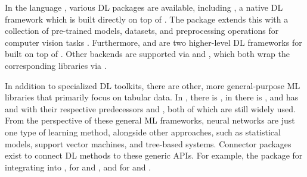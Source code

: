 \documentclass[article]{jss}
\theoremstyle{definition}
\begin{document}
In the  language \citep{ref-R-base}, various DL packages are available, including  \citep{ref-torch2025}, a native DL framework which is built directly on top of .
The  \rlang{} package extends this with a collection of pre-trained models, datasets, and preprocessing operations for computer vision tasks \citep{ref-r-torchvision}.
Furthermore,  \citep{ref-luz2023} and  \citep{ref-cito2024} are two higher-level DL frameworks for \rlang{} built on top of \torch{}.
Other backends are supported via  \citep{ref-keras32025} and  \citep{ref-r-tensorflow2024}, which both wrap the corresponding \python{} libraries via  \citep{ref-reticulate2025}.

In addition to specialized DL toolkits, there are other, more general-purpose ML libraries that primarily focus on tabular data.
In \python, there is \sklearn{} \citep{ref-pedregosa2011scikit-learn}, in \julia{} there is \mlj{} \citep{ref-blaom2020mlj}, and \rlang{} has \tidymodels{} \citep{ref-kuhn2020tidymodels} and  \citep{ref-mlr32019} with their respective predecessors  \citep{ref-kuhn2021caret} and  \citep{ref-bischl2016mlr}, both of which are still widely used.
From the perspective of these general ML frameworks, neural networks are just one type of learning method, alongside other approaches, such as statistical models, support vector machines, and tree-based systems.
Connector packages exist to connect DL methods to these generic APIs.
For example, the  package \citep{ref-skorch} for integrating  into \sklearn{},  \citep{ref-MLJFlux} for \flux{} and \mlj{}, and  \citep{ref-brulee2025} for \torch{} and \tidymodels{}.
\end{document}
